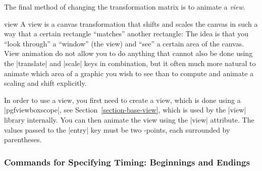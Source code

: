 The final method of changing the transformation matrix is to animate 
a \emph{view.}

\begin{animateattribute}{view}
  A view is a canvas transformation that shifts and
  scales the canvas in such a way that a certain rectangle ``matches''
  another rectangle: The idea is that you ``look through'' a ``window''
  (the view) and ``see'' a certain area of the canvas. View animation do
  not allow you to do anything that cannot also be done using the
  |translate| and |scale| keys in combination, but it often much more
  natural to animate which area of a graphic you wish to see than to
  compute and animate a scaling and shift explicitly.
  
  In order to use a view, you first need to create a view, which is done
  using a |{pgfviewboxscope}|, see Section~\ref{section-base-view},
  which is used by the |view| library internally. You can then animate
  the view using the |view| attribute. The values passed to the |entry|
  key must be two \pgfname-points, each surrounded by parentheses.
  
\begin{codeexample}[width=2cm]
\end{codeexample}  
\end{animateattribute}


\subsubsection{Commands for Specifying Timing: Beginnings  and
  Endings}


